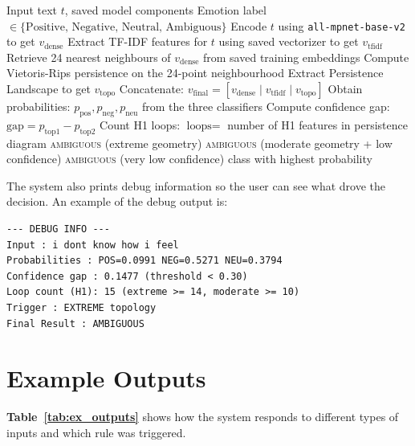 \begin{algorithm}[H]
\caption{Inference and Ambiguity Detection}
\label{alg:infer}
\begin{algorithmic}[1]
\Require Input text $t$, saved model components
\Ensure Emotion label $\in \{\text{Positive, Negative, Neutral, Ambiguous}\}$
\State Encode $t$ using \texttt{all-mpnet-base-v2} to get $v_{\text{dense}}$
\State Extract TF-IDF features for $t$ using saved vectorizer to get $v_{\text{tfidf}}$
\State Retrieve 24 nearest neighbours of $v_{\text{dense}}$ from saved training embeddings
\State Compute Vietoris-Rips persistence on the 24-point neighbourhood
\State Extract Persistence Landscape to get $v_{\text{topo}}$
\State Concatenate: $v_{\text{final}} = [v_{\text{dense}} \mid v_{\text{tfidf}} \mid v_{\text{topo}}]$
\State Obtain probabilities: $p_{\text{pos}}, p_{\text{neg}}, p_{\text{neu}}$ from the three classifiers
\State Compute confidence gap: $\text{gap} = p_{\text{top1}} - p_{\text{top2}}$
\State Count H1 loops: $\text{loops} =$ number of H1 features in persistence diagram
    \State \Return \textsc{ambiguous} (extreme geometry)
    \State \Return \textsc{ambiguous} (moderate geometry + low confidence)
    \State \Return \textsc{ambiguous} (very low confidence)
\Else
    \State \Return class with highest probability
\EndIf
\end{algorithmic}
\end{algorithm}

The system also prints debug information so the user can see what drove the decision. An
example of the debug output is:

\begin{verbatim}
--- DEBUG INFO ---
Input : i dont know how i feel
Probabilities : POS=0.0991 NEG=0.5271 NEU=0.3794
Confidence gap : 0.1477 (threshold < 0.30)
Loop count (H1): 15 (extreme >= 14, moderate >= 10)
Trigger : EXTREME topology
Final Result : AMBIGUOUS
\end{verbatim}

\section{Example Outputs}

\textbf{Table~\ref{tab:ex_outputs}} shows how the system responds to different types of inputs and which
rule was triggered.

